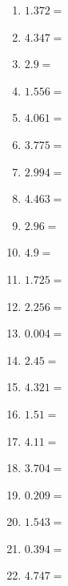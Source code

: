 \documentclass[12pt]{article}
\begin{document}
\begin{enumerate}
\item \large $ 1.372 = $ \vspace{1.5cm}
\item \large $ 4.347 = $ \vspace{1.5cm}
\item \large $ 2.9 = $ \vspace{1.5cm}
\item \large $ 1.556 = $ \vspace{1.5cm}
\newpage
\item \large $ 4.061 = $ \vspace{1.5cm}
\item \large $ 3.775 = $ \vspace{1.5cm}
\item \large $ 2.994 = $ \vspace{1.5cm}
\item \large $ 4.463 = $ \vspace{1.5cm}
\item \large $ 2.96 = $ \vspace{1.5cm}
\item \large $ 4.9 = $ \vspace{1.5cm}
\item \large $ 1.725 = $ \vspace{1.5cm}
\item \large $ 2.256 = $ \vspace{1.5cm}
\item \large $ 0.004 = $ \vspace{1.5cm}
\item \large $ 2.45 = $ \vspace{1.5cm}
\newpage
\item \large $ 4.321 = $ \vspace{1.5cm}
\item \large $ 1.51 = $ \vspace{1.5cm}
\item \large $ 4.11 = $ \vspace{1.5cm}
\item \large $ 3.704 = $ \vspace{1.5cm}
\item \large $ 0.209 = $ \vspace{1.5cm}
\item \large $ 1.543 = $ \vspace{1.5cm}
\item \large $ 0.394 = $ \vspace{1.5cm}
\item \large $ 4.747 = $ \vspace{1.5cm}

\end{enumerate}
\end{document}
